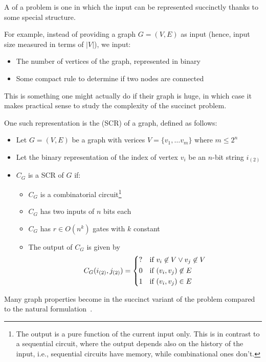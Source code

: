 \documentclass[a4paper]{report}
\theoremstyle{definition}
\begin{document}
A  of a problem is one in which the input can be represented succinctly thanks to some special structure.

For example, instead of providing a graph $G=(V,E)$ as input (hence, input size measured in terms of $|V|$), we input: 
\begin{itemize}
\item The number of vertices of the graph, represented in binary
\item Some compact rule to determine if two nodes are connected
\end{itemize}

This is something one might actually do if their graph is huge, in which case it makes practical sense to study the complexity of the succinct problem.

One such representation is the  (SCR) of a graph, defined as follows:
\begin{itemize}
\item Let $G=(V,E)$ be a graph with verices $V = \{v_1, \dots v_m \}$ where $m \leq 2^n$
\item Let the binary representation of the index of vertex $v_i$ be an $n$-bit string $i_{(2)}$
\item $C_G$ is a SCR of $G$ if:
\begin{itemize}
\item $C_G$ is a combinatorial circuit\footnote{The output is a pure function of the current input only. This is in contrast to a sequential circuit, where the output depends also on the history of the input, i.e., sequential circuits have memory, while combinational ones don't.}
\item $C_G$ has two inputs of $n$ bits each
\item $C_G$ has $r \in O(n^k)$ gates with $k$ constant
\item The output of $C_G$ is given by
\begin{align*}
C_G(i_{(2)},j_{(2)}) = 
\begin{cases*}
? & if $v_i \not\in V \vee v_j \not\in V$\\
0 & if $(v_i,v_j) \not\in E$\\
1 & if $(v_i,v_j) \in E$\\
\end{cases*}
\end{align*}
\end{itemize}
\end{itemize}

Many graph properties become  in the succinct variant of the problem compared to the natural formulation~\citep{galperin1983succinct}.
\end{document}
